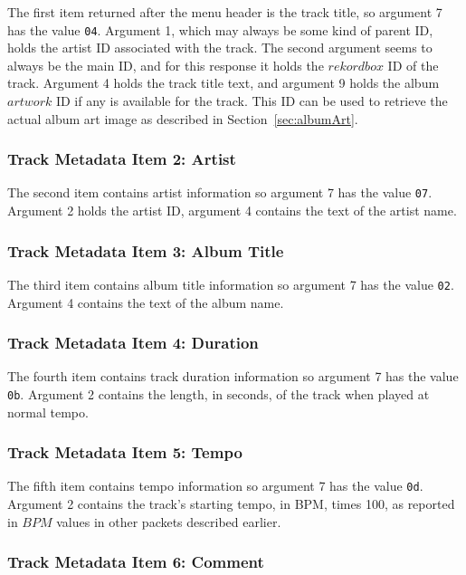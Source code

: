 \documentclass[11pt]{article}
\begin{document}
The first item returned after the menu header is the track title, so
argument 7 has the value {\tt 04}. Argument 1, which may always be
some kind of parent ID, holds the artist ID associated with the track.
The second argument seems to always be the main ID, and for this
response it holds the $rekordbox$ ID of the track. Argument 4 holds
the track title text, and argument 9 holds the album $artwork$ ID if
any is available for the track. This ID can be used to retrieve the
actual album art image as described in Section~\ref{sec:albumArt}.

\subsubsection{Track Metadata Item 2: Artist}

The second item contains artist information so argument 7 has the
value {\tt 07}. Argument 2 holds the artist ID, argument 4 contains
the text of the artist name.

\subsubsection{Track Metadata Item 3: Album Title}

The third item contains album title information so argument 7 has the
value {\tt 02}. Argument 4 contains the text of the album name.

\subsubsection{Track Metadata Item 4: Duration}

The fourth item contains track duration information so argument 7 has
the value {\tt 0b}. Argument 2 contains the length, in seconds, of
the track when played at normal tempo.

\subsubsection{Track Metadata Item 5: Tempo}

The fifth item contains tempo information so argument 7 has the value
{\tt 0d}. Argument 2 contains the track's starting tempo, in BPM,
times 100, as reported in $BPM$ values in other packets described
earlier.

\subsubsection{Track Metadata Item 6: Comment}
\end{document}
